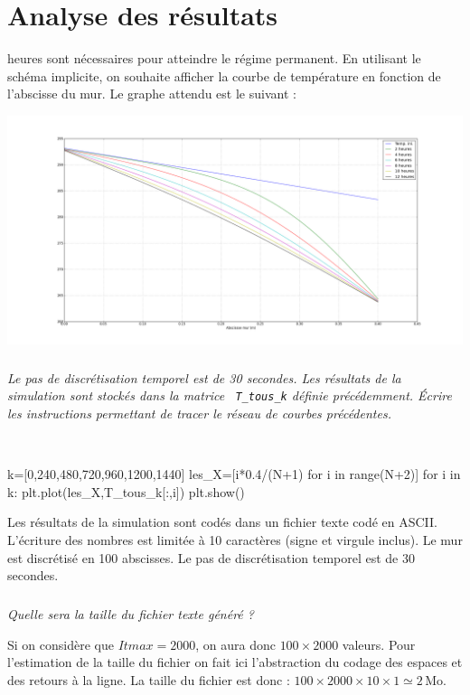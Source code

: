 \documentclass[10pt,fleqn]{article} %
\begin{document}
\section{Analyse des résultats}
\ifprof
{} heures sont nécessaires pour atteindre le régime permanent. En utilisant le schéma implicite, on souhaite afficher la courbe de température en fonction de l'abscisse du mur. Le graphe attendu est le suivant :

\begin{center}
\includegraphics[width=\linewidth]{images/figure_04}
\end{center}

\fi

\subparagraph{}
\textit{Le pas de discrétisation temporel est de 30 secondes. Les résultats de la simulation sont stockés dans la matrice  \texttt{ T\_tous\_k}  définie précédemment. Écrire les instructions permettant de tracer le réseau de courbes précédentes.}
\ifprof

\begin{corrige}
~\\
\begin{python}
k=[0,240,480,720,960,1200,1440]
les_X=[i*0.4/(N+1) for i in range(N+2)]
for i in k:
    plt.plot(les_X,T_tous_k[:,i])
plt.show()
\end{python}
\end{corrige}
\else
\fi

\ifprof
\else
\vspace{.5cm}

Les résultats de la simulation sont codés dans un fichier texte codé en ASCII. L'écriture des nombres est limitée à 10 caractères (signe et virgule inclus). 
Le mur est discrétisé en 100 abscisses. Le pas de discrétisation temporel est de 30 secondes. 
\fi

\subparagraph{}
\textit{Quelle sera la taille du fichier texte généré ?}
\ifprof
\begin{corrige}
Si on considère que $Itmax=2000$, on aura donc $100 \times 2000$ valeurs. Pour l'estimation de la taille du fichier on fait ici l'abstraction du codage des espaces et des retours à la ligne. 
La taille du fichier est donc : $100 \times 2000 \times 10 \times 1 \simeq 2\, \text{Mo}$.
\end{corrige}
\else
\fi
\end{document}
